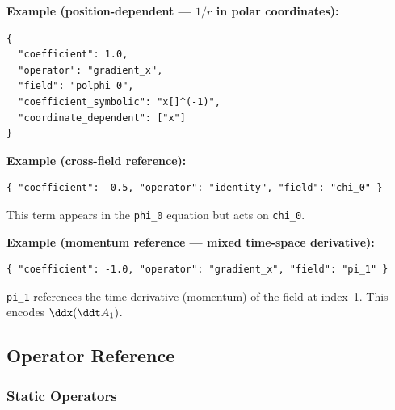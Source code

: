 \textbf{Example (position-dependent --- $1/r$ in polar coordinates):}

\begin{lstlisting}[style=json]
{
  "coefficient": 1.0,
  "operator": "gradient_x",
  "field": "polphi_0",
  "coefficient_symbolic": "x[]^(-1)",
  "coordinate_dependent": ["x"]
}
\end{lstlisting}

\textbf{Example (cross-field reference):}

\begin{lstlisting}[style=json]
{ "coefficient": -0.5, "operator": "identity", "field": "chi_0" }
\end{lstlisting}

This term appears in the \texttt{phi\_0} equation but acts on \texttt{chi\_0}.

\textbf{Example (momentum reference --- mixed time-space derivative):}

\begin{lstlisting}[style=json]
{ "coefficient": -1.0, "operator": "gradient_x", "field": "pi_1" }
\end{lstlisting}

\texttt{pi\_1} references the time derivative (momentum) of the field at index~1. This encodes $\ddx(\ddt A_1)$.


\subsection{Operator Reference}
\label{sec:json-operators}

\subsubsection{Static Operators}
\label{sec:json-static-operators}

